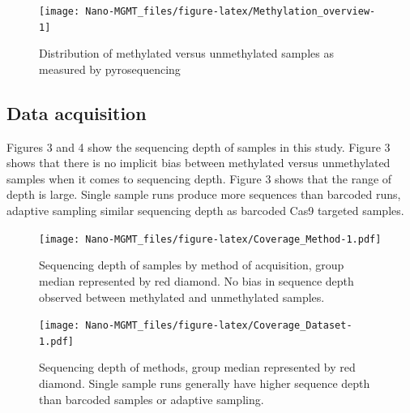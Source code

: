 \documentclass[
]{article}
\begin{document}
\begin{table}

\caption{\label{tab:Sample_overview}Overview of samples included in this study}
\centering
{}
\end{table}

\begin{figure}
\texttt{[image: Nano-MGMT\_files/figure-latex/Methylation\_overview-1]} \caption{Distribution of methylated versus unmethylated samples as measured by pyrosequencing}\label{fig:Methylation_overview}
\end{figure}

\hypertarget{data-acquisition}{%
\subsection{Data acquisition}\label{data-acquisition}}

Figures 3 and 4 show the sequencing depth of samples in this study.
Figure 3 shows that there is no implicit bias between methylated versus
unmethylated samples when it comes to sequencing depth. Figure 3 shows
that the range of depth is large. Single sample runs produce more
sequences than barcoded runs, adaptive sampling similar sequencing depth
as barcoded Cas9 targeted samples.

\begin{figure}
\centering
\texttt{[image: Nano-MGMT\_files/figure-latex/Coverage\_Method-1.pdf]}
\caption{Sequencing depth of samples by method of acquisition, group
median represented by red diamond. No bias in sequence depth observed
between methylated and unmethylated samples.}
\end{figure}

\begin{figure}
\centering
\texttt{[image: Nano-MGMT\_files/figure-latex/Coverage\_Dataset-1.pdf]}
\caption{Sequencing depth of methods, group median represented by red
diamond. Single sample runs generally have higher sequence depth than
barcoded samples or adaptive sampling.}
\end{figure}
\end{document}
